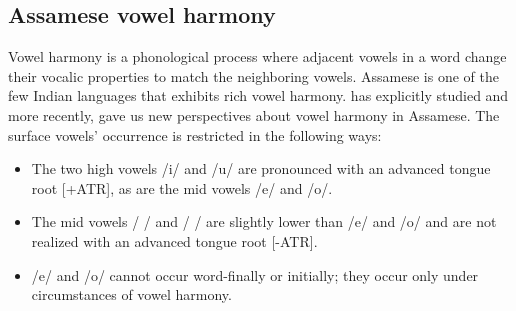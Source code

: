 \documentclass{Interspeech2024}
\begin{document}
\begin{table}[!ht]
\centering
{}
\caption{Vowel inventory of Assamese}
\label{tab:accents}
\end{table}
\subsection{Assamese vowel harmony}
Vowel harmony is a phonological process where adjacent vowels in a word change their vocalic properties to match the neighboring vowels. Assamese is one of the few Indian languages that exhibits rich vowel harmony. \cite{mahanta_directionality_2008} has explicitly studied and more recently, \cite{archangeli_assamese_2020} gave us new perspectives about vowel harmony in Assamese.
The surface vowels' occurrence is restricted in the following ways: 

\begin{itemize}
    \item The two high vowels /i/ and /u/ are pronounced with an advanced tongue root [+ATR], as are the mid vowels /e/ and /o/.
    \item The mid vowels / \textepsilon/ and / \textopeno/ are slightly lower than /e/ and /o/ and are not realized with an advanced tongue root [-ATR].
    \item /e/ and /o/ cannot occur word-finally or initially; they occur only under circumstances of vowel harmony.
\end{itemize} 

\begin{table} [!ht]
  \centering
\caption{An example of vowel harmony in Assamese \cite{mahanta_directionality_2008}}
\label{harmonytable}
\end{table}
\end{document}
